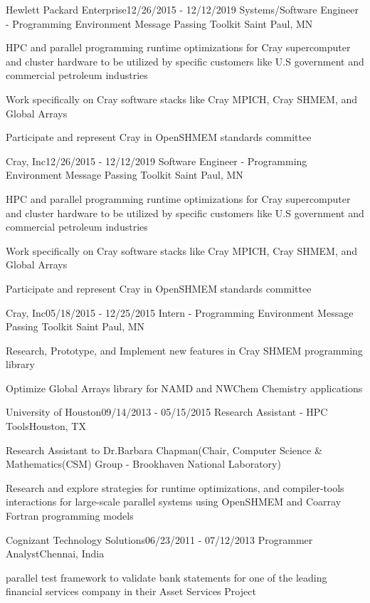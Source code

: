 \begin{rSubsection}{Hewlett Packard Enterprise}{12/26/2015 - 12/12/2019}
                   {Systems/Software Engineer - Programming Environment Message Passing Toolkit}
                   {Saint Paul, MN}
\item HPC and parallel programming runtime optimizations for Cray supercomputer
      and cluster hardware to be utilized by specific customers like U.S
      government and commercial petroleum industries
\item Work specifically on Cray software stacks like Cray MPICH, Cray SHMEM, and
      Global Arrays
\item Participate and represent Cray in OpenSHMEM standards committee
\end{rSubsection}

\begin{rSubsection}{Cray, Inc}{12/26/2015 - 12/12/2019}
                   {Software Engineer - Programming Environment Message Passing Toolkit}
                   {Saint Paul, MN}
\item HPC and parallel programming runtime optimizations for Cray supercomputer
      and cluster hardware to be utilized by specific customers like U.S
      government and commercial petroleum industries
\item Work specifically on Cray software stacks like Cray MPICH, Cray SHMEM, and
      Global Arrays
\item Participate and represent Cray in OpenSHMEM standards committee
\end{rSubsection}

\begin{rSubsection}{Cray, Inc}{05/18/2015 - 12/25/2015}
                   {Intern - Programming Environment Message Passing Toolkit}
                   {Saint Paul, MN}
\item Research, Prototype, and Implement new features in Cray SHMEM programming
      library
\item Optimize Global Arrays library for NAMD and NWChem Chemistry applications
\end{rSubsection}

\begin{rSubsection}{University of Houston}{09/14/2013 - 05/15/2015}
                   {Research Assistant - HPC Tools}{Houston, TX}
\item Research Assistant to Dr.Barbara Chapman(Chair, Computer Science
      \& Mathematics(CSM) Group - Brookhaven National Laboratory)
\item Research and explore strategies for runtime optimizations, and
      compiler-tools interactions for large-scale parallel systems using
      OpenSHMEM and Coarray Fortran programming models
\end{rSubsection}

\begin{rSubsection}{Cognizant Technology Solutions}{06/23/2011 - 07/12/2013}
                   {Programmer Analyst}{Chennai, India}
\item parallel test framework to validate bank statements for one of the leading
financial services company in their Asset Services Project
\end{rSubsection}
